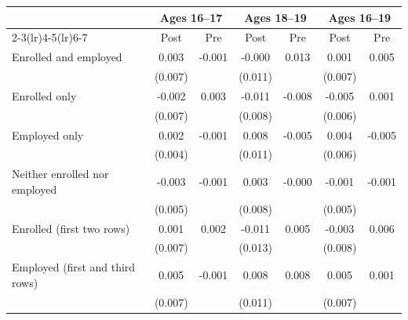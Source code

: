 \begin{tabular}{lcccccc}
\toprule
 & \multicolumn{2}{c}{Ages 16--17} & \multicolumn{2}{c}{Ages 18--19} & \multicolumn{2}{c}{Ages 16--19} \\
\cmidrule(lr){2-3}\cmidrule(lr){4-5}\cmidrule(lr){6-7}
 & Post & Pre & Post & Pre & Post & Pre \\
\midrule
Enrolled and employed & 0.003 & -0.001 & -0.000 & 0.013 & 0.001 & 0.005 \\
 & (0.007) &  & (0.011) &  & (0.007) &  \\
Enrolled only & -0.002 & 0.003 & -0.011 & -0.008 & -0.005 & 0.001 \\
 & (0.007) &  & (0.008) &  & (0.006) &  \\
Employed only & 0.002 & -0.001 & 0.008 & -0.005 & 0.004 & -0.005 \\
 & (0.004) &  & (0.011) &  & (0.006) &  \\
Neither enrolled nor employed & -0.003 & -0.001 & 0.003 & -0.000 & -0.001 & -0.001 \\
 & (0.005) &  & (0.008) &  & (0.005) &  \\
Enrolled (first two rows) & 0.001 & 0.002 & -0.011 & 0.005 & -0.003 & 0.006 \\
 & (0.007) &  & (0.013) &  & (0.008) &  \\
Employed (first and third rows) & 0.005 & -0.001 & 0.008 & 0.008 & 0.005 & 0.001 \\
 & (0.007) &  & (0.011) &  & (0.007) &  \\
\bottomrule
\end{tabular}
